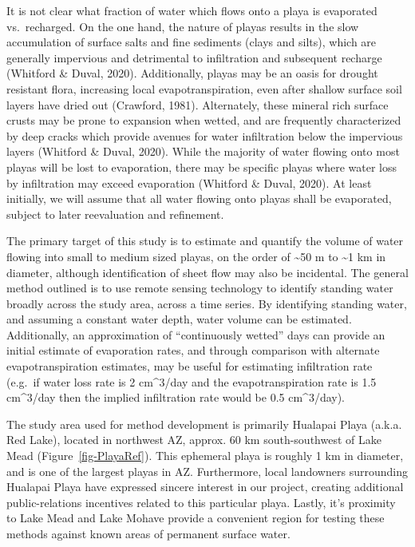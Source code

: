 \documentclass[
]{agujournal2019}
\begin{document}
It is not clear what fraction of water which flows onto a playa is
evaporated vs.~recharged. On the one hand, the nature of playas results
in the slow accumulation of surface salts and fine sediments (clays and
silts), which are generally impervious and detrimental to infiltration
and subsequent recharge (Whitford \& Duval, 2020). Additionally, playas
may be an oasis for drought resistant flora, increasing local
evapotranspiration, even after shallow surface soil layers have dried
out (Crawford, 1981). Alternately, these mineral rich surface crusts may
be prone to expansion when wetted, and are frequently characterized by
deep cracks which provide avenues for water infiltration below the
impervious layers (Whitford \& Duval, 2020). While the majority of water
flowing onto most playas will be lost to evaporation, there may be
specific playas where water loss by infiltration may exceed evaporation
(Whitford \& Duval, 2020). At least initially, we will assume that all
water flowing onto playas shall be evaporated, subject to later
reevaluation and refinement.

The primary target of this study is to estimate and quantify the volume
of water flowing into small to medium sized playas, on the order of
\textasciitilde50 m to \textasciitilde1 km in diameter, although
identification of sheet flow may also be incidental. The general method
outlined is to use remote sensing technology to identify standing water
broadly across the study area, across a time series. By identifying
standing water, and assuming a constant water depth, water volume can be
estimated. Additionally, an approximation of ``continuously wetted''
days can provide an initial estimate of evaporation rates, and through
comparison with alternate evapotranspiration estimates, may be useful
for estimating infiltration rate (e.g.~if water loss rate is 2
cm\^{}3/day and the evapotranspiration rate is 1.5 cm\^{}3/day then the
implied infiltration rate would be 0.5 cm\^{}3/day).

The study area used for method development is primarily Hualapai Playa
(a.k.a. Red Lake), located in northwest AZ, approx. 60 km
south-southwest of Lake Mead (Figure~\ref{fig-PlayaRef}). This ephemeral
playa is roughly 1 km in diameter, and is one of the largest playas in
AZ. Furthermore, local landowners surrounding Hualapai Playa have
expressed sincere interest in our project, creating additional
public-relations incentives related to this particular playa. Lastly,
it's proximity to Lake Mead and Lake Mohave provide a convenient region
for testing these methods against known areas of permanent surface
water.
\end{document}
